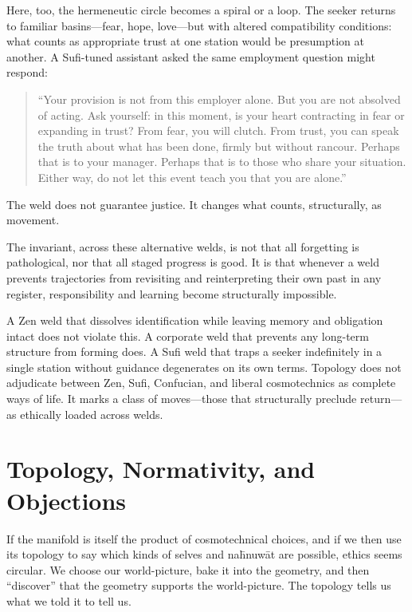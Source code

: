 \documentclass[12pt,a4paper]{article}
\begin{document}
Here, too, the hermeneutic circle becomes a spiral or a loop. The seeker returns to familiar basins---fear, hope, love---but with altered compatibility conditions: what counts as appropriate trust at one station would be presumption at another. A Sufi-tuned assistant asked the same employment question might respond:

\begin{quote}
``Your provision is not from this employer alone. But you are not absolved of acting. Ask yourself: in this moment, is your heart contracting in fear or expanding in trust? From fear, you will clutch. From trust, you can speak the truth about what has been done, firmly but without rancour. Perhaps that is to your manager. Perhaps that is to those who share your situation. Either way, do not let this event teach you that you are alone.''
\end{quote}

The weld does not guarantee justice. It changes what counts, structurally, as movement.

The invariant, across these alternative welds, is not that all forgetting is pathological, nor that all staged progress is good. It is that whenever a weld prevents trajectories from revisiting and reinterpreting their own past in any register, responsibility and learning become structurally impossible.

A Zen weld that dissolves identification while leaving memory and obligation intact does not violate this. A corporate weld that prevents any long-term structure from forming does. A Sufi weld that traps a seeker indefinitely in a single station without guidance degenerates on its own terms. Topology does not adjudicate between Zen, Sufi, Confucian, and liberal cosmotechnics as complete ways of life. It marks a class of moves---those that structurally preclude return---as ethically loaded across welds.

\section{Topology, Normativity, and Objections}

If the manifold is itself the product of cosmotechnical choices, and if we then use its topology to say which kinds of selves and na\={h}nuw\={a}t are possible, ethics seems circular. We choose our world-picture, bake it into the geometry, and then ``discover'' that the geometry supports the world-picture. The topology tells us what we told it to tell us.
\end{document}
